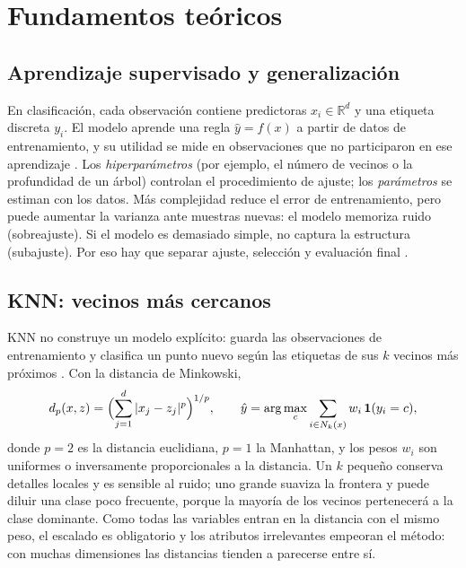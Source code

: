 \section{Fundamentos teóricos}

\subsection{Aprendizaje supervisado y generalización}
En clasificación, cada observación contiene predictoras $x_i\in\mathbb{R}^d$ y una
etiqueta discreta $y_i$. El modelo aprende una regla $\hat y=f(x)$ a partir de
datos de entrenamiento, y su utilidad se mide en observaciones que no participaron
en ese aprendizaje \cite{hastie}. Los \emph{hiperparámetros} (por ejemplo, el número
de vecinos o la profundidad de un árbol) controlan el procedimiento de ajuste; los
\emph{parámetros} se estiman con los datos. Más complejidad reduce el error de
entrenamiento, pero puede aumentar la varianza ante muestras nuevas: el modelo
memoriza ruido (sobreajuste). Si el modelo es demasiado simple, no captura la
estructura (subajuste). Por eso hay que separar ajuste, selección y evaluación final
\cite{sklearnleakage,sklearnmetrics}.

\subsection{KNN: vecinos más cercanos}
KNN no construye un modelo explícito: guarda las observaciones de entrenamiento y
clasifica un punto nuevo según las etiquetas de sus $k$ vecinos más próximos
\cite{coverhart,sklearnknn}. Con la distancia de Minkowski,
\[
 d_p(x,z)=\Bigl(\sum_{j=1}^{d}|x_j-z_j|^p\Bigr)^{1/p},
 \qquad
 \hat y=\arg\max_c\sum_{i\in N_k(x)}w_i\,\mathbf{1}(y_i=c),
\]
donde $p=2$ es la distancia euclidiana, $p=1$ la Manhattan, y los pesos $w_i$ son
uniformes o inversamente proporcionales a la distancia. Un $k$ pequeño conserva
detalles locales y es sensible al ruido; uno grande suaviza la frontera y puede
diluir una clase poco frecuente, porque la mayoría de los vecinos pertenecerá a la
clase dominante. Como todas las variables entran en la distancia con el mismo peso,
el escalado es obligatorio y los atributos irrelevantes empeoran el método: con
muchas dimensiones las distancias tienden a parecerse entre sí.

